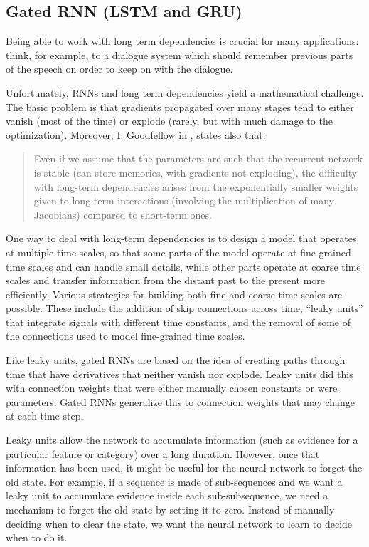 \subsection{Gated RNN (LSTM and GRU)}
\label{subsec:gated-rnn}

Being able to work with long term dependencies is crucial for many
applications: think, for example, to a dialogue system which should
remember previous parts of the speech on order to keep on with the
dialogue.

Unfortunately, RNNs and long term dependencies yield a mathematical
challenge. The basic problem is that gradients propagated over many
stages tend to either vanish (most of the time) or explode (rarely,
but with much damage to the optimization). Moreover, I. Goodfellow
\etal{} in , states also that:

\begin{quote}
  Even if we assume that the parameters are such that the recurrent
  network is stable (can store memories, with gradients not
  exploding), the diﬃculty with long-term dependencies arises from the
  exponentially smaller weights given to long-term interactions
  (involving the multiplication of many Jacobians) compared to
  short-term ones.
\end{quote}

One way to deal with long-term dependencies is to design a model that
operates at multiple time scales, so that some parts of the model
operate at ﬁne-grained time scales and can handle small details, while
other parts operate at coarse time scales and transfer information
from the distant past to the present more eﬃciently. Various
strategies for building both ﬁne and coarse time scales are possible.
These include the addition of skip connections across time, ``leaky
units'' that integrate signals with diﬀerent time constants, and the
removal of some of the connections used to model ﬁne-grained time
scales.

Like leaky units, gated RNNs are based on the idea of creating paths
through time that have derivatives that neither vanish nor explode.
Leaky units did this with connection weights that were either manually
chosen constants or were parameters. Gated RNNs generalize this to
connection weights that may change at each time step.

Leaky units allow the network to accumulate information (such as
evidence for a particular feature or category) over a long duration.
However, once that information has been used, it might be useful for
the neural network to forget the old state. For example, if a sequence
is made of sub-sequences and we want a leaky unit to accumulate
evidence inside each sub-subsequence, we need a mechanism to forget
the old state by setting it to zero. Instead of manually deciding when
to clear the state, we want the neural network to learn to decide when
to do it.

